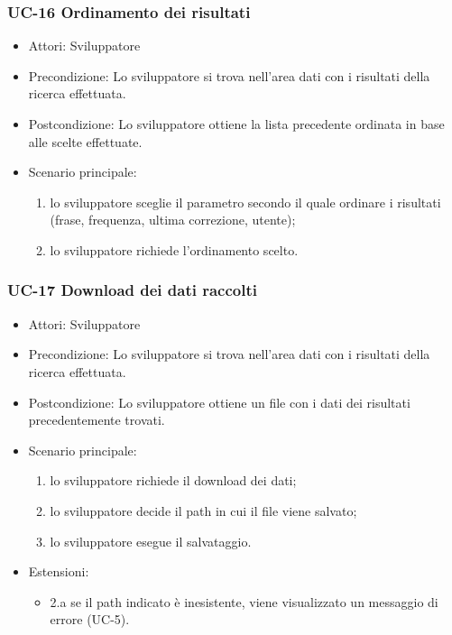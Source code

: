 	\subsubsection{UC-16 Ordinamento dei risultati}
		\begin{itemize}
			\item Attori: Sviluppatore
			\item Precondizione: Lo sviluppatore si trova nell'area dati con i risultati della ricerca effettuata.
			\item Postcondizione: Lo sviluppatore ottiene la lista precedente ordinata in base alle scelte effettuate.
			\item Scenario principale:
				\begin{enumerate}
					\item lo sviluppatore sceglie il parametro secondo il quale ordinare i risultati (frase, frequenza, ultima correzione, utente);
					\item lo sviluppatore richiede l'ordinamento scelto.
				\end{enumerate}
		\end{itemize} 
	
	\subsubsection{UC-17 Download dei dati raccolti}
		\begin{itemize}
			\item Attori: Sviluppatore
			\item Precondizione: Lo sviluppatore si trova nell'area dati con i risultati della ricerca effettuata.
			\item Postcondizione: Lo sviluppatore ottiene un file con i dati dei risultati precedentemente trovati.
			\item Scenario principale:
				\begin{enumerate}
					\item lo sviluppatore richiede il download dei dati;
					\item lo sviluppatore decide il path in cui il file viene salvato;
					\item lo sviluppatore esegue il salvataggio.
				\end{enumerate}
			\item Estensioni:
				\begin{itemize}
					\item 2.a se il path indicato è inesistente, viene visualizzato un messaggio di errore (UC-5).
				\end{itemize}
		\end{itemize} 

